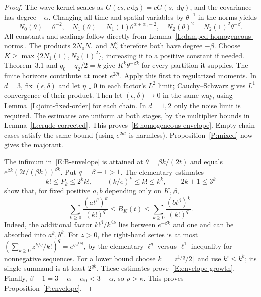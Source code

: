 \documentclass[12pt]{article}
\numberwithin{equation}{section}
\theoremstyle{definition}
\newcommand{\ud}{\,\mathrm{d}}
\begin{document}
\begin{proof}
  The wave kernel scales as
  $G(cs,c\ud y)=cG(s,\ud y)$, and the covariance has degree $-\alpha$.
  Changing all time and spatial variables by $\theta^{-1}$ in the norms
  yields
  \begin{equation}\label{E:homogeneous-norms}
    N_0(\theta)=\theta^{-2},\quad
    N_1(\theta)=N_1(1)\theta^{\alpha+\alpha_0-2},\quad
    N_2(\theta)^2=N_2(1)^2\theta^{-\beta}.
  \end{equation}
  All constants and scalings follow directly from
  Lemma~\ref{L:damped-homogeneous-norms}.
  The products $2N_0N_1$ and $N_2^2$ therefore both have degree
  $-\beta$. Choose
  $K\ge\max\{2N_1(1),N_2(1)^2\}$, increasing it to a positive
  constant if needed. Theorem~3.1 and $q_0+q_2/2=k$ give
  $K^k\theta^{-\beta k}$ for every partition it supplies. The finite
  horizons contribute at most $e^{2\theta t}$. Apply this first to
  regularized moments. In $d=3$, fix $(\epsilon,\delta)$ and let
  $\eta\downarrow0$ in each factor's $L^2$ limit; Cauchy--Schwarz gives
  $L^1$ convergence of their product. Then let
  $(\epsilon,\delta)\to0$ in the same way, using Lemma~\ref{L:joint-fixed-order} for each
  chain. In $d=1,2$ only the noise limit is required. The estimates are
  uniform at both stages, by the multiplier bounds in
  Lemma~\ref{L:crude-corrected}. This proves~\eqref{E:homogeneous-envelope}.
  Empty-chain cases satisfy the same bound (using $e^{2\theta t}$ is
  harmless). Proposition~\ref{P:mixed} now gives the majorant.

  The infimum in~\eqref{E:B-envelope} is attained at
  $\theta=\beta k/(2t)$ and equals
  $e^{\beta k}(2t/(\beta k))^{\beta k}$. Put $q=\beta-1>1$.
  The elementary estimates
  \[
    k!\le P_k\le2^k k!,\qquad
    (k/e)^k\le k!\le k^k,\qquad 2k+1\le3^k
  \]
  show that, for fixed positive $a,b$ depending only on $K,\beta$,
  \[
    \sum_{k\ge0}\frac{(at^\beta)^k}{(k!)^q}
    \le B_K(t)\le
    \sum_{k\ge0}\frac{(bt^\beta)^k}{(k!)^q}.
  \]
  Indeed, the additional factor $k!^\beta/k^{\beta k}$ lies between
  $e^{-\beta k}$ and one and can be absorbed into $a^k,b^k$.
  For $z>0$, the right-hand series is at most
  $(\sum_{k\ge0}z^{k/q}/k!)^q=e^{qz^{1/q}}$, by the elementary
  $\ell^q$ versus $\ell^1$ inequality for nonnegative sequences.
  For a lower bound choose $k=\lfloor z^{1/q}/2\rfloor$ and use
  $k!\le k^k$; its single summand is at least $2^{qk}$.
  These estimates prove~\eqref{E:envelope-growth}. Finally,
  $\beta-1=3-\alpha-\alpha_0<3-\alpha$, so $\rho>\kappa$.
  This proves Proposition~\ref{P:envelope}.
\end{proof}
\end{document}
